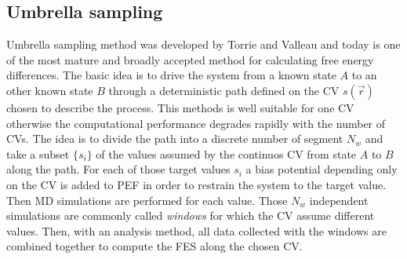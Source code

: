 \subsection{Umbrella sampling}
Umbrella sampling method was developed by Torrie and Valleau and today is one of the most mature and broadly accepted method for calculating free energy differences. The basic idea is to drive the system from a known state $A$ to an other known state $B$ through a deterministic path defined on the \ac{CV} $s(\vec r)$ chosen to describe the process. This methods is well suitable for one \ac{CV} otherwise the computational performance degrades rapidly with the number of \acp{CV}. The idea is to divide the path into a discrete number of segment $N_w$ and take a subset $\{s_i\}$ of the values assumed by the continuos \ac{CV} from state $A$ to $B$ along the path. For each of those target values $s_i$ a bias potential depending only on the \ac{CV} is added to \ac{PEF} in order to restrain the system to the target value. Then \ac{MD} simulations are performed for each value. Those $N_w$ independent simulations are commonly called \textit{windows} for which the \ac{CV} assume different values. Then, with an analysis method, all data collected with the windows are combined together to compute the \ac{FES} along the chosen \ac{CV}.

